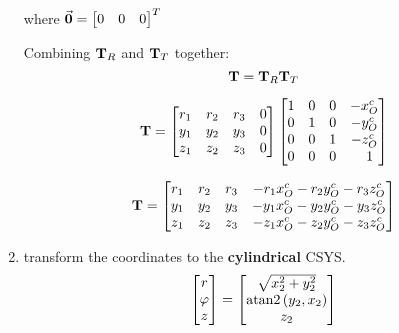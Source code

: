 \begin{enumerate}
         where $ \vec{\mathbf{0}} = \begin{bmatrix} 0 & 0 & 0 \end{bmatrix}^T $

         Combining $ \mathbf{T}_R $ and $ \mathbf{T}_T $ together:
         \begin{equation}
             \mathbf{T} = \mathbf{T}_R \mathbf{T}_T
         \end{equation}

         \begin{equation}
             \mathbf{T} = \begin{bmatrix}
                 r_1 & r_2 & r_3 & 0 \\
                 y_1 & y_2 & y_3 & 0 \\
                 z_1 & z_2 & z_3 & 0 \\
             \end{bmatrix}
             \begin{bmatrix}
                 1 & 0 & 0 & -x_O^c \\
                 0 & 1 & 0 & -y_O^c \\
                 0 & 0 & 1 & -z_O^c \\
                 0 & 0 & 0 & \phantom{-}1 \\
             \end{bmatrix}
         \end{equation}

         \begin{equation}
             \mathbf{T} = \begin{bmatrix}
                 r_1 & r_2 & r_3 & -r_1 x_O^c -r_2 y_O^c -r_3 z_O^c  \\
                 y_1 & y_2 & y_3 & -y_1 x_O^c -y_2 y_O^c -y_3 z_O^c  \\
                 z_1 & z_2 & z_3 & -z_1 x_O^c -z_2 y_O^c -z_3 z_O^c  \\
             \end{bmatrix}
         \end{equation}


    \item transform the coordinates to the \textbf{cylindrical} CSYS.
        \begin{equation}
            \begin{bmatrix}
                r \\
                \varphi \\
                z \\
            \end{bmatrix}
            = \begin{bmatrix}
                \sqrt{x_2^2 + y_2^2} \\
                \operatorname{atan2} \left(y_2, x_2\right) \\
                z_2 \\
            \end{bmatrix}
        \end{equation}

\end{enumerate}

